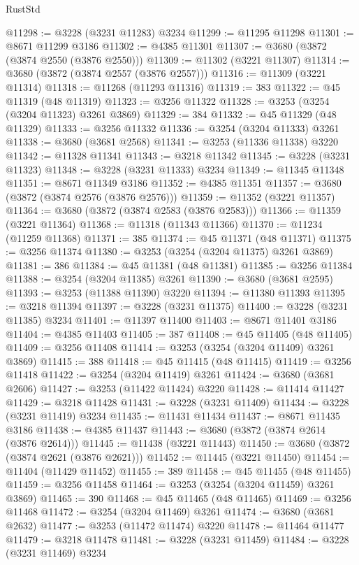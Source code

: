 \begin{lexlean}{RustStd}
\begin{coremodule}
@11298 := @3228 (@3231 @11283) @3234
@11299 := @11295 @11298
@11301 := @8671 @11299 @3186
@11302 := @4385 @11301
@11307 := @3680 (@3872 (@3874 @2550 (@3876 @2550)))
@11309 := @11302 (@3221 @11307)
@11314 := @3680 (@3872 (@3874 @2557 (@3876 @2557)))
@11316 := @11309 (@3221 @11314)
@11318 := @11268 (@11293 @11316)
@11319 := 383
@11322 := @45 @11319 (@48 @11319)
@11323 := @3256 @11322
@11328 := @3253 (@3254 (@3204 @11323) @3261 @3869)
@11329 := 384
@11332 := @45 @11329 (@48 @11329)
@11333 := @3256 @11332
@11336 := @3254 (@3204 @11333) @3261
@11338 := @3680 (@3681 @2568)
@11341 := @3253 (@11336 @11338) @3220
@11342 := @11328 @11341
@11343 := @3218 @11342
@11345 := @3228 (@3231 @11323)
@11348 := @3228 (@3231 @11333) @3234
@11349 := @11345 @11348
@11351 := @8671 @11349 @3186
@11352 := @4385 @11351
@11357 := @3680 (@3872 (@3874 @2576 (@3876 @2576)))
@11359 := @11352 (@3221 @11357)
@11364 := @3680 (@3872 (@3874 @2583 (@3876 @2583)))
@11366 := @11359 (@3221 @11364)
@11368 := @11318 (@11343 @11366)
@11370 := @11234 (@11259 @11368)
@11371 := 385
@11374 := @45 @11371 (@48 @11371)
@11375 := @3256 @11374
@11380 := @3253 (@3254 (@3204 @11375) @3261 @3869)
@11381 := 386
@11384 := @45 @11381 (@48 @11381)
@11385 := @3256 @11384
@11388 := @3254 (@3204 @11385) @3261
@11390 := @3680 (@3681 @2595)
@11393 := @3253 (@11388 @11390) @3220
@11394 := @11380 @11393
@11395 := @3218 @11394
@11397 := @3228 (@3231 @11375)
@11400 := @3228 (@3231 @11385) @3234
@11401 := @11397 @11400
@11403 := @8671 @11401 @3186
@11404 := @4385 @11403
@11405 := 387
@11408 := @45 @11405 (@48 @11405)
@11409 := @3256 @11408
@11414 := @3253 (@3254 (@3204 @11409) @3261 @3869)
@11415 := 388
@11418 := @45 @11415 (@48 @11415)
@11419 := @3256 @11418
@11422 := @3254 (@3204 @11419) @3261
@11424 := @3680 (@3681 @2606)
@11427 := @3253 (@11422 @11424) @3220
@11428 := @11414 @11427
@11429 := @3218 @11428
@11431 := @3228 (@3231 @11409)
@11434 := @3228 (@3231 @11419) @3234
@11435 := @11431 @11434
@11437 := @8671 @11435 @3186
@11438 := @4385 @11437
@11443 := @3680 (@3872 (@3874 @2614 (@3876 @2614)))
@11445 := @11438 (@3221 @11443)
@11450 := @3680 (@3872 (@3874 @2621 (@3876 @2621)))
@11452 := @11445 (@3221 @11450)
@11454 := @11404 (@11429 @11452)
@11455 := 389
@11458 := @45 @11455 (@48 @11455)
@11459 := @3256 @11458
@11464 := @3253 (@3254 (@3204 @11459) @3261 @3869)
@11465 := 390
@11468 := @45 @11465 (@48 @11465)
@11469 := @3256 @11468
@11472 := @3254 (@3204 @11469) @3261
@11474 := @3680 (@3681 @2632)
@11477 := @3253 (@11472 @11474) @3220
@11478 := @11464 @11477
@11479 := @3218 @11478
@11481 := @3228 (@3231 @11459)
@11484 := @3228 (@3231 @11469) @3234

\end{coremodule}
\end{lexlean}
